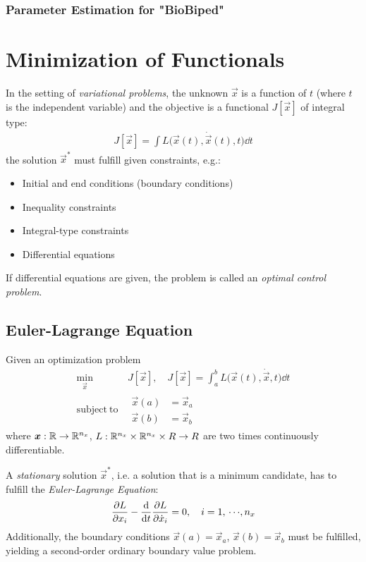 		\subsection{Parameter Estimation for "BioBiped"} %

\chapter{Minimization of Functionals}
	In the setting of \emph{variational problems}, the unknown \(\vec{x}\) is a function of \(t\) (where \(t\) is the independent variable) and the objective is a functional \( J[\vec{x}] \) of integral type:
	\begin{align*}
		J[\vec{x}] = \int\! L\big( \vec{x}(t), \dot{\vec{x}}(t), t \big) \dd{t}
	\end{align*}
	the solution \( \vec{x}^\ast \) must fulfill given constraints, e.g.:
	\begin{itemize}
		\item Initial and end conditions (boundary conditions)
		\item Inequality constraints
		\item Integral-type constraints
		\item Differential equations
	\end{itemize}
	If differential equations are given, the problem is called an \emph{optimal control problem}.

	\section{Euler-Lagrange Equation} %
		Given an optimization problem
		\begin{align*}
			\min_{\vec{x}} &\, J[\vec{x}],\quad J[\vec{x}] = \int_a^b\! L\big(\vec{x}(t), \dot{\vec{x}}, t\big) \dd{t} \\
			\mathrm{subject~to} &\,
				\begin{alignedat}{2}
					\vec{x}(a) &= \vec{x}_a \\
					\vec{x}(b) &= \vec{x}_b
				\end{alignedat}
		\end{align*}
		where \( \bm{x} : \mathbb{R} \to \mathbb{R}^{n_x} \), \( L : \mathbb{R}^{n_x} \times \mathbb{R}^{n_x} \times R \to R \) are two times continuously differentiable.

		A \emph{stationary} solution \( \vec{x}^\ast \), i.e. a solution that is a minimum candidate, has to fulfill the \emph{Euler-Lagrange Equation}:
		\begin{align*}
			\pdv{L}{x_i} - \dv{t} \pdv{L}{\dot{x}_i} = 0,\quad i = 1,\,\cdots\!,n_x
		\end{align*}
		Additionally, the boundary conditions \( \vec{x}(a) = \vec{x}_a \), \( \vec{x}(b) = \vec{x}_b \) must be fulfilled, yielding a second-order ordinary boundary value problem.

